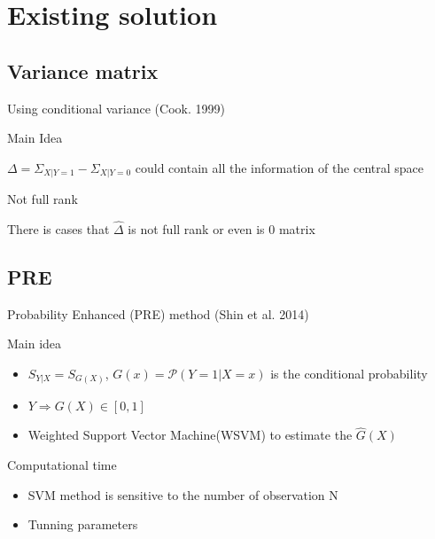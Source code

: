 \documentclass[ignorenonframetext,]{beamer}
\providecommand{\tightlist}{%
  \setlength{\itemsep}{0pt}\setlength{\parskip}{0pt}}
\begin{document}
\section{Existing solution}\label{existing-solution}

\subsection{Variance matrix}\label{variance-matrix}

\begin{frame}{Using conditional variance (Cook. 1999)}

\begin{block}{Main Idea}

\(\Delta = \Sigma_{X|Y = 1} - \Sigma_{X|Y = 0}\) could contain all the
information of the central space

\end{block}

\begin{block}{Not full rank}

There is cases that \(\hat \Delta\) is not full rank or even is 0 matrix

\end{block}

\end{frame}

\subsection{PRE}\label{pre}

\begin{frame}{Probability Enhanced (PRE) method (Shin et al. 2014)}

\begin{block}{Main idea}

\begin{itemize}
\tightlist
\item
  \(S_{Y|X} = S_{G(X)}\), \(G(x) = \mathcal{P}(Y = 1|X = x)\) is the
  conditional probability
\item
  \(Y \Rightarrow G(X) \in [0,1]\)
\item
  Weighted Support Vector Machine(WSVM) to estimate the \(\hat{G}(X)\)
\end{itemize}

\end{block}

\begin{block}{Computational time}

\begin{itemize}
\tightlist
\item
  SVM method is sensitive to the number of observation N
\item
  Tunning parameters
\end{itemize}

\end{block}

\end{frame}
\end{document}
